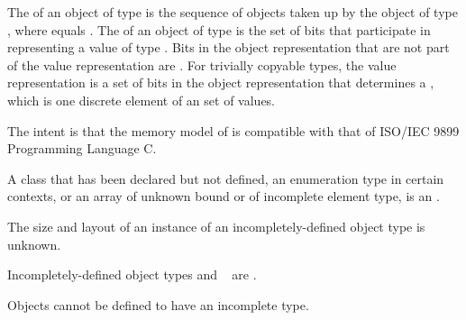 \pnum
\label{term.object.representation}%
The 
of an object of type  is the
sequence of   objects taken up
by the object of type , where  equals
.
The 
of an object of type  is the set of bits
that participate in representing a value of type .
\label{term.padding.bits}%
Bits in the object representation that are not part of the value representation
are .
For trivially copyable types, the value representation is
a set of bits in the object representation that determines a
, which is one discrete element of an
 set of values.
\begin{footnote}
The
intent is that the memory model of \Cpp{} is compatible
with that of ISO/IEC 9899 Programming Language C.
\end{footnote}

\pnum
{}%
A class that has been declared but not defined, an enumeration type in certain
contexts, or an array of unknown
bound or of incomplete element type, is an
.
\begin{footnote}
The size and layout of an instance of an incompletely-defined
object type is unknown.
\end{footnote}
\label{term.incomplete.type}%
Incompletely-defined object types and \cv{}~ are
.
\begin{note}
Objects cannot be defined to have an incomplete type.
\end{note}

